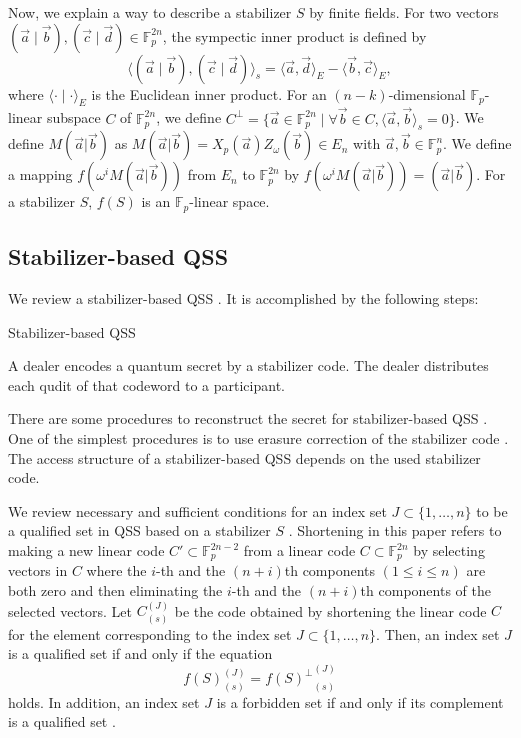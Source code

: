 \documentclass[11pt,a4paper]{article}
\theoremstyle{definition}
\begin{document}
Now, we explain a way to describe a stabilizer $S$ by finite fields. 
For two vectors $(\vec{a}\mid \vec{b}),(\vec{c}\mid \vec{d})\in \mathbb{F}_p^{2n}$, the sympectic inner product is defined by
\begin{equation}
    \langle(\vec{a}\mid \vec{b}),(\vec{c}\mid \vec{d})\rangle_s=\langle\vec{a},\vec{d}\rangle_E-\langle\vec{b},\vec{c}\rangle_E, 
\end{equation}
where $\langle\cdot \mid \cdot\rangle_E$ is the Euclidean inner product.
For an $(n-k)$-dimensional $\mathbb{F}_p$-linear subspace $C$ of $\mathbb{F}_p^{2n}$, 
we define $C^{\perp} = \{\vec{a}\in\mathbb{F}^{2n}_p\mid \forall \vec{b}\in C,\langle\vec{a},\vec{b}\rangle_s=0\}$. 
We define $M(\vec{a}|\vec{b})$ as $M(\vec{a}|\vec{b}) = X_p(\vec{a})Z_\omega(\vec{b})\in {E_n}$ with $\vec{a}, \vec{b}\in \mathbb{F}_p^n$. 
We define a mapping $f(\omega^i M(\vec{a}|\vec{b}))$ from ${E_n}$ to $\mathbb{F}_p^{2n}$ by $f(\omega^i M(\vec{a}|\vec{b})) = (\vec{a}|\vec{b})$.
For a stabilizer $S$, $f(S)$ is an $\mathbb{F}_p$-linear space.

\subsection{Stabilizer-based QSS}
We review a stabilizer-based QSS \cite{QSS_Cleve_1999}. 
It is accomplished by the following steps:
\begin{algorithm}[H]
	\caption{Stabilizer-based QSS}
	\begin{algorithmic}[1]
    \STATE A dealer encodes a quantum secret by a stabilizer code.
    \STATE The dealer distributes each qudit of that codeword to a participant.
    \end{algorithmic}
\end{algorithm}

There are some procedures to reconstruct the secret for stabilizer-based QSS \cite{Unitary_reconstruction_Matsumoto_2017}.
One of the simplest procedures is to use erasure correction of the stabilizer code \cite{QSS_Cleve_1999}.
The access structure of a stabilizer-based QSS depends on the used stabilizer code. 

We review necessary and sufficient conditions for an index set $J\subset\{1,\dots,n\}$ to be a qualified set 
in QSS based on a stabilizer $S$ \cite{Unitary_reconstruction_Matsumoto_2017}. 
Shortening in this paper refers to making a new linear code $C'\subset \mathbb{F}^{2n-2}_p$ from a linear code $C\subset \mathbb{F}_p^{2n}$ 
by selecting vectors in $C$ where the $i$-th and the $(n+i)$th components $(1\leq i\leq n)$ are both zero and then eliminating the $i$-th and the $(n+i)$th components of the selected vectors.
Let $C_{(s)}^{(J)}$ be the code obtained by shortening the linear code $C$ for the element corresponding to the index set $J\subset\{1,\dots,n\}$.
Then, an index set $J$ is a qualified set if and only if the equation 
\begin{equation}
    f(S)_{(s)}^{(J)} = {f(S)^\perp}_{(s)}^{(J)}
\end{equation}
holds. 
In addition, an index set $J$ is a forbidden set if and only if its complement is a qualified set \cite{rampQSS_Ogawa_2005}.
\end{document}

